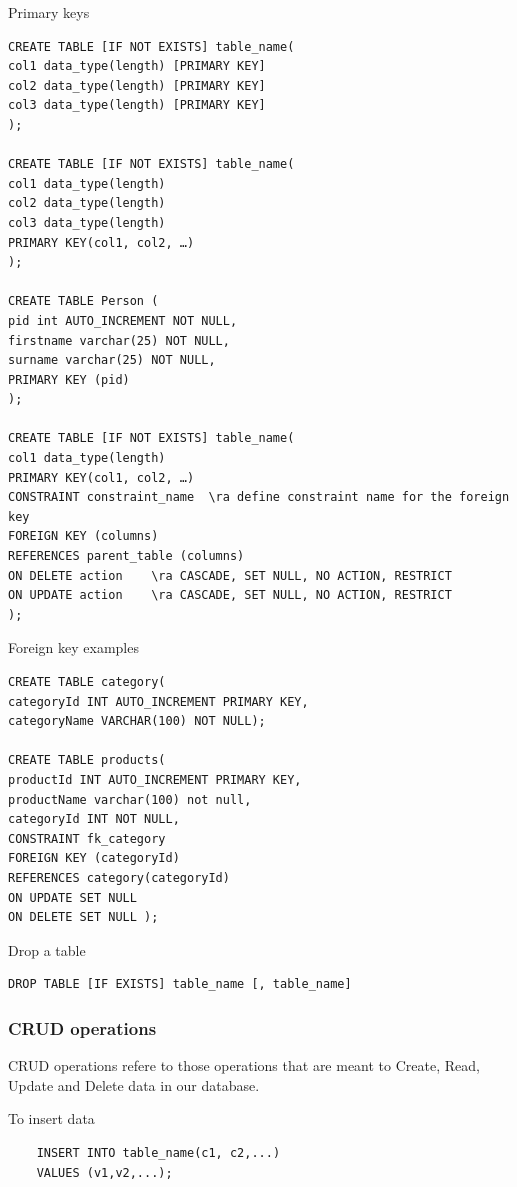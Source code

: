 Primary keys 

\begin{verbatim}
CREATE TABLE [IF NOT EXISTS] table_name(
col1 data_type(length) [PRIMARY KEY]
col2 data_type(length) [PRIMARY KEY]
col3 data_type(length) [PRIMARY KEY]
);

CREATE TABLE [IF NOT EXISTS] table_name(
col1 data_type(length)
col2 data_type(length)
col3 data_type(length)
PRIMARY KEY(col1, col2, …)
);

CREATE TABLE Person (
pid int AUTO_INCREMENT NOT NULL,
firstname varchar(25) NOT NULL,
surname varchar(25) NOT NULL,
PRIMARY KEY (pid)
);

CREATE TABLE [IF NOT EXISTS] table_name(
col1 data_type(length)
PRIMARY KEY(col1, col2, …)
CONSTRAINT constraint_name  \ra define constraint name for the foreign key
FOREIGN KEY (columns)
REFERENCES parent_table (columns)
ON DELETE action    \ra CASCADE, SET NULL, NO ACTION, RESTRICT
ON UPDATE action    \ra CASCADE, SET NULL, NO ACTION, RESTRICT
);

\end{verbatim}

Foreign key examples

\begin{verbatim}
CREATE TABLE category(
categoryId INT AUTO_INCREMENT PRIMARY KEY,
categoryName VARCHAR(100) NOT NULL);

CREATE TABLE products(
productId INT AUTO_INCREMENT PRIMARY KEY,
productName varchar(100) not null,
categoryId INT NOT NULL,
CONSTRAINT fk_category
FOREIGN KEY (categoryId)
REFERENCES category(categoryId)
ON UPDATE SET NULL
ON DELETE SET NULL ); 
\end{verbatim}

Drop a table

\begin{verbatim}
DROP TABLE [IF EXISTS] table_name [, table_name]
\end{verbatim}


\subsubsection{CRUD operations}


CRUD operations refere to those operations that are meant to Create, Read, Update and Delete data in our database.

\vspace{10pt}

To insert data

\begin{verbatim}
    INSERT INTO table_name(c1, c2,...)
    VALUES (v1,v2,...);
\end{verbatim}

